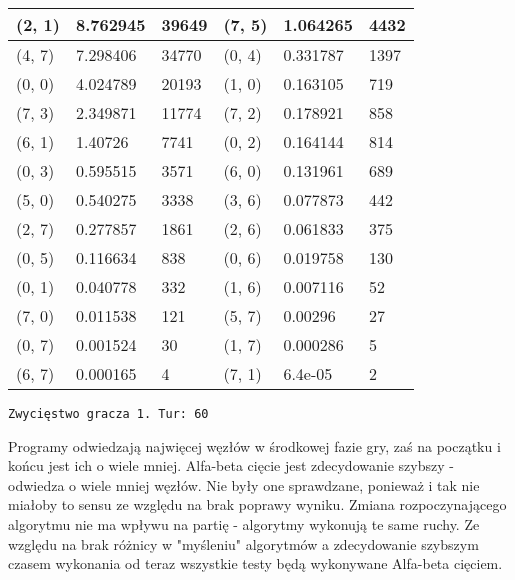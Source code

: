 \documentclass[12pt, a4paper]{article}
\begin{document}
\begin{center}
\begin{tabular}{ | m{4em} | m{4.5em} | m{3em} | m{4em} | m{4.5em} | m{3em} |}
        (2, 1) & 8.762945 & 39649 & (7, 5) & 1.064265 & 4432 \\
        \hline
        (4, 7) & 7.298406 & 34770 & (0, 4) & 0.331787 & 1397 \\
        \hline
        (0, 0) & 4.024789 & 20193 & (1, 0) & 0.163105 & 719 \\
        \hline
        (7, 3) & 2.349871 & 11774 & (7, 2) & 0.178921 & 858 \\
        \hline
        (6, 1) & 1.40726 & 7741 & (0, 2) & 0.164144 & 814 \\
        \hline
        (0, 3) & 0.595515 & 3571 & (6, 0) & 0.131961 & 689 \\
        \hline
        (5, 0) & 0.540275 & 3338 & (3, 6) & 0.077873 & 442 \\
        \hline
        (2, 7) & 0.277857 & 1861 & (2, 6) & 0.061833 & 375 \\
        \hline
        (0, 5) & 0.116634 & 838 & (0, 6) & 0.019758 & 130 \\
        \hline
        (0, 1) & 0.040778 & 332 & (1, 6) & 0.007116 & 52 \\
        \hline
        (7, 0) & 0.011538 & 121 & (5, 7) & 0.00296 & 27 \\
        \hline
        (0, 7) & 0.001524 & 30 & (1, 7) & 0.000286 & 5 \\
        \hline
        (6, 7) & 0.000165 & 4 & (7, 1) & 6.4e-05 & 2 \\
        \hline
    \end{tabular}
\end{center}
\texttt{Zwycięstwo gracza 1. Tur: 60}

Programy odwiedzają najwięcej węzłów w środkowej fazie gry,
zaś na początku i końcu jest ich o wiele mniej.
Alfa-beta cięcie jest zdecydowanie szybszy - odwiedza o wiele mniej węzłów.
Nie były one sprawdzane, ponieważ i tak nie miałoby to sensu ze względu na brak poprawy wyniku.
Zmiana rozpoczynającego algorytmu nie ma wpływu na partię - algorytmy wykonują te same ruchy.
Ze względu na brak różnicy w "myśleniu" algorytmów a zdecydowanie szybszym czasem wykonania od teraz
wszystkie testy będą wykonywane Alfa-beta cięciem.
\end{document}
